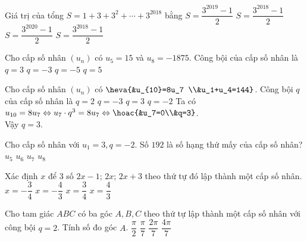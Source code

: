 \begin{ex}%
	Giá trị của tổng $S=1+3+3^2+\cdots+3^{2018}$ bằng
	\choice
	{\True $S=\dfrac{3^{2019}-1}{2}$}
	{$S=\dfrac{3^{2018}-1}{2}$}
	{$S=\dfrac{3^{2020}-1}{2}$}
	{$S=\dfrac{3^{2018}-1}{2}$}
\end{ex}   

\begin{ex}%
	Cho cấp số nhân $(u_{n})$ có $u_{5}=15$ và $u_{8}=-1875$. Công bội của cấp số nhân là
	\choice
	{$q=3$}
	{$q=-3$}
	{\True $q=-5$}
	{$q=5$}
\end{ex}

\begin{ex}%
	Cho cấp số nhân $(u_n)$ có $\heva{&u_{10}=8u_7 \\&u_1+u_4=144}$. Công bội $q$ của cấp số nhân là 
	\choice
	{$q=2$}
	{$q=-3$}
	{\True $q=3$}
	{$q=-2$}
	\loigiai
	{
		Ta có $u_{10}=8u_{7} \Leftrightarrow u_7\cdot q^3 =8u_7 \Leftrightarrow \hoac{&u_7=0\\&q=3}$.\\
		Vậy $q=3$.
	}
\end{ex}


\begin{ex}%
	Cho cấp số nhân với $ u_1 = 3, q = -2. $ Số $ 192 $ là số hạng thứ mấy của cấp số nhân?
	\choice
	{$ u_5 $}
	{$ u_6$}
	{\True $ u_7 $}
	{$ u_8 $}
\end{ex}

\begin{ex}%
	Xác định $x$ để 3 số $2x-1$; $2x$; $2x+3$ theo thứ tự đó lập thành một cấp số nhân.
	\choice
	{$x=-\dfrac{3}{4}$}
	{$x=-\dfrac{4}{3}$}
	{\True $x=\dfrac{3}{4}$}
	{$x=\dfrac{4}{3}$}
\end{ex}

\begin{ex}%
	Cho tam giác $ABC$ có ba góc $A,B,C$ theo thứ tự lập thành một cấp số nhân với công bội $q=2$. Tính số đo góc $A$.
	\choice
	{$\dfrac{\pi}{2}$}
	{$\dfrac{\pi}{7}$}
	{\True $\dfrac{2\pi}{7}$}
	{$\dfrac{4\pi}{7}$}
\end{ex}


